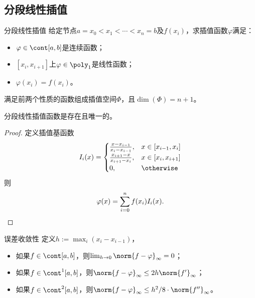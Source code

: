 \subsection{分段线性插值}

\begin{definition}
    {分段线性插值}{}
    给定节点$a=x_0<x_1<\cdots<x_n=b$及$f(x_i)$，求插值函数$\varphi$满足：
    \begin{itemize}
        \item $\varphi\in\cont[a,b]$是连续函数；
        \item $[x_i,x_{i+1}]$上$\varphi\in\poly_1$是线性函数；
        \item $\varphi(x_i)=f(x_i)$。
    \end{itemize}
    满足前两个性质的函数组成插值空间$\Phi$，且$\dim(\Phi)=n+1$。
\end{definition}

\begin{theorem}
    {}{}
    分段线性插值函数是存在且唯一的。
\end{theorem}

\begin{proof}
    定义插值基函数
    \begin{equation}
        I_i(x)=\begin{cases}
            \frac{x-x_{i-1}}{x_i-x_{i-1}},&x\in[x_{i-1},x_i]\\
            \frac{x_{i+1}-x}{x_{i+1}-x_i},&x\in[x_i,x_{i+1}]\\
            0,&\otherwise
        \end{cases}
    \end{equation}
    则
    \begin{equation}
        \varphi(x)=\sum_{i=0}^nf(x_i)I_i(x).
        \qedhere
    \end{equation}
\end{proof}

\begin{theorem}
    {误差收敛性}{}
    定义$h:=\max_i(x_i-x_{i-1})$，
    \begin{itemize}
        \item 如果$f\in\cont[a,b]$，则$\lim_{h\to0}\norm{f-\varphi}_\infty=0$；
        \item 如果$f\in\cont^1[a,b]$，则$\norm{f-\varphi}_\infty\leq 2h\norm{f'}_\infty$；
        \item 如果$f\in\cont^2[a,b]$，则$\norm{f-\varphi}_\infty\leq h^2/8\cdot\norm{f''}_\infty$。
    \end{itemize}
\end{theorem}

